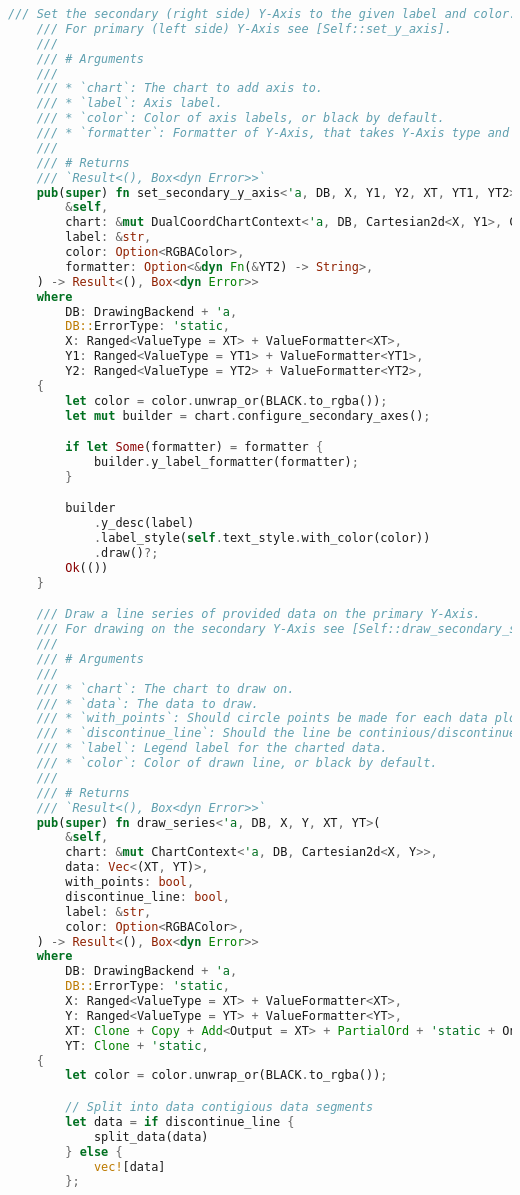 \begin{lstlisting}[language=rust, caption={graphing/components.rs}]
	/// Set the secondary (right side) Y-Axis to the given label and color.
	/// For primary (left side) Y-Axis see [Self::set_y_axis].
	///
	/// # Arguments
	///
	/// * `chart`: The chart to add axis to.
	/// * `label`: Axis label.
	/// * `color`: Color of axis labels, or black by default.
	/// * `formatter`: Formatter of Y-Axis, that takes Y-Axis type and returns String.
	///
	/// # Returns
	/// `Result<(), Box<dyn Error>>`
	pub(super) fn set_secondary_y_axis<'a, DB, X, Y1, Y2, XT, YT1, YT2>(
		&self,
		chart: &mut DualCoordChartContext<'a, DB, Cartesian2d<X, Y1>, Cartesian2d<X, Y2>>,
		label: &str,
		color: Option<RGBAColor>,
		formatter: Option<&dyn Fn(&YT2) -> String>,
	) -> Result<(), Box<dyn Error>>
	where
		DB: DrawingBackend + 'a,
		DB::ErrorType: 'static,
		X: Ranged<ValueType = XT> + ValueFormatter<XT>,
		Y1: Ranged<ValueType = YT1> + ValueFormatter<YT1>,
		Y2: Ranged<ValueType = YT2> + ValueFormatter<YT2>,
	{
		let color = color.unwrap_or(BLACK.to_rgba());
		let mut builder = chart.configure_secondary_axes();

		if let Some(formatter) = formatter {
			builder.y_label_formatter(formatter);
		}

		builder
			.y_desc(label)
			.label_style(self.text_style.with_color(color))
			.draw()?;
		Ok(())
	}

	/// Draw a line series of provided data on the primary Y-Axis.
	/// For drawing on the secondary Y-Axis see [Self::draw_secondary_series].
	///
	/// # Arguments
	///
	/// * `chart`: The chart to draw on.
	/// * `data`: The data to draw.
	/// * `with_points`: Should circle points be made for each data plot?
	/// * `discontinue_line`: Should the line be continious/discontinue if part of the data is missing?
	/// * `label`: Legend label for the charted data.
	/// * `color`: Color of drawn line, or black by default.
	///
	/// # Returns
	/// `Result<(), Box<dyn Error>>`
	pub(super) fn draw_series<'a, DB, X, Y, XT, YT>(
		&self,
		chart: &mut ChartContext<'a, DB, Cartesian2d<X, Y>>,
		data: Vec<(XT, YT)>,
		with_points: bool,
		discontinue_line: bool,
		label: &str,
		color: Option<RGBAColor>,
	) -> Result<(), Box<dyn Error>>
	where
		DB: DrawingBackend + 'a,
		DB::ErrorType: 'static,
		X: Ranged<ValueType = XT> + ValueFormatter<XT>,
		Y: Ranged<ValueType = YT> + ValueFormatter<YT>,
		XT: Clone + Copy + Add<Output = XT> + PartialOrd + 'static + One,
		YT: Clone + 'static,
	{
		let color = color.unwrap_or(BLACK.to_rgba());

		// Split into data contigious data segments
		let data = if discontinue_line {
			split_data(data)
		} else {
			vec![data]
		};


\end{lstlisting}
